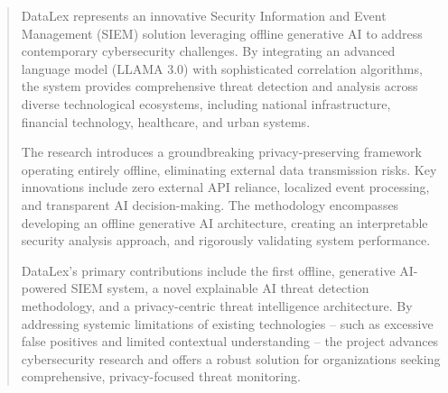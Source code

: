 \begin{abstract}

\hspace{1cm} DataLex represents an innovative Security Information and Event Management (SIEM) solution leveraging offline generative AI to address contemporary cybersecurity challenges. By integrating an advanced language model (LLAMA 3.0) with sophisticated correlation algorithms, the system provides comprehensive threat detection and analysis across diverse technological ecosystems, including national infrastructure, financial technology, healthcare, and urban systems.

\vspace{0.3cm}
\hspace{1cm} The research introduces a groundbreaking privacy-preserving framework operating entirely offline, eliminating external data transmission risks. Key innovations include zero external API reliance, localized event processing, and transparent AI decision-making. The methodology encompasses developing an offline generative AI architecture, creating an interpretable security analysis approach, and rigorously validating system performance.

\vspace{0.3cm}
\hspace{1cm} DataLex's primary contributions include the first offline, generative AI-powered SIEM system, a novel explainable AI threat detection methodology, and a privacy-centric threat intelligence architecture. By addressing systemic limitations of existing technologies -- such as excessive false positives and limited contextual understanding -- the project advances cybersecurity research and offers a robust solution for organizations seeking comprehensive, privacy-focused threat monitoring.

\end{abstract}

\clearpage
{}
